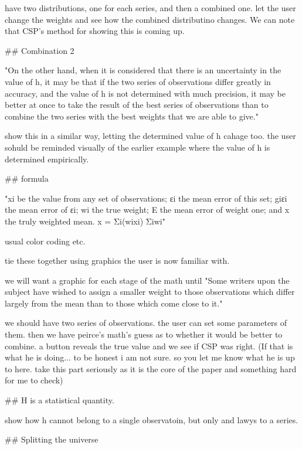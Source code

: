 have two distributions, one for each series, and then a combined one. let the user change the weights and see how the combined distributino changes. We can note that CSP's method for showing this is coming up. 


## Combination 2

"On the other hand, when it is considered that there is an uncertainty in the value of h, it may be that if the two series of observations differ greatly in accuracy, and the value of h is not determined with much precision, it may be better at once to take the result of the best series of observations than to combine the two series with the best weights that we are able to give."

show this in a similar way, letting the determined value of h cahage too. the user sohuld be reminded visually of the earlier example where the value of h is determined empirically. 

## formula

"xi be the value from any set of observations;
εi the mean error of this set;
giεi the mean error of εi;
wi the true weight;
E the mean error of weight one; and
x the truly weighted mean.
x = 
Σi(wixi)
Σiwi"

usual color coding etc. 

tie these together using graphics the user is now familiar with. 


we will want a graphic for each stage of the math until "Some writers upon the subject have wished to assign a smaller weight to those observations which differ largely from the mean than to those which come close to it."

we should have two series of observations. the user can set some parameters of them. then we have peirce's math's guess as to whether it would be better to combine. a button reveals the true value and we see if CSP was right.  (If that is what he is doing... to be honest i am not sure. so you let me know what he is up to here. take this part seriously as it is the core of the paper and something hard for me to check)


## H is a statistical quantity. 

show how h cannot belong to a single observatoin, but only and lawys to a series. 



## Splitting the universe

